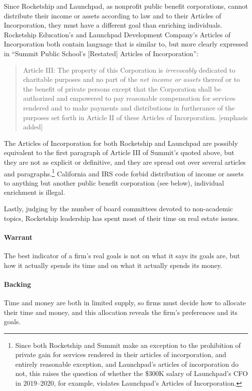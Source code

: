 Since Rocketship and Launchpad, as nonprofit public benefit corporations, cannot distribute their income or assets according to law and to their Articles of Incorporation, they must have a different goal than enriching individuals. Rocketship Education's and Launchpad Development Company's Articles of Incorporation both contain language that is similar to, but more clearly expressed in ``Summit Public School's [Restated] Articles of Incorporation'':
\begin{quotation}\noindent%
Article III: The property of this Corporation is \textit{irrevocably} dedicated to charitable purposes and no part of the \textit{net income or assets} thereof or to the benefit of private persons except that the Corporation shall be authorized and empowered to pay reasonable compensation for services rendered and to make payments and distributions in furtherance of the purposes set forth in Article II of these Articles of Incorporation. [emphasis added]
\end{quotation}
The Articles of Incorporation for both Rocketship and Launchpad are possibly equivalent to the first paragraph of Article III of Summit's quoted above, but they are not as explicit or definitive, and they are spread out over several articles and paragraphs.\footnote{Since both Rocketship and Summit make an exception to the prohibition of private gain for services rendered in their articles of incorporation, and entirely reasonable exception, and Launchpad's articles of incorporation do not, this raises the question of whether the \$300K salary of Launchpad's CFO \parencite[7]{zotero-16512} in 2019–2020, for example, violates Launchpad's Articles of Incorporation.} California and IRS code forbid distribution of income or assets to anything but another public benefit corporation (see  below), individual enrichment is illegal. 

Lastly, judging by the number of board committees devoted to non-academic topics, Rocketship leadership has spent most of their time on real estate issues.

\paragraph{Warrant}
The best indicator of a firm's real goals is not on what it says its goals are, but how it actually spends its time and on what it actually spends its money. 

\paragraph{Backing}
Time and money are both in limited supply, so firms must decide how to allocate their time and money, and this allocation reveals the firm's preferences and its goals.

